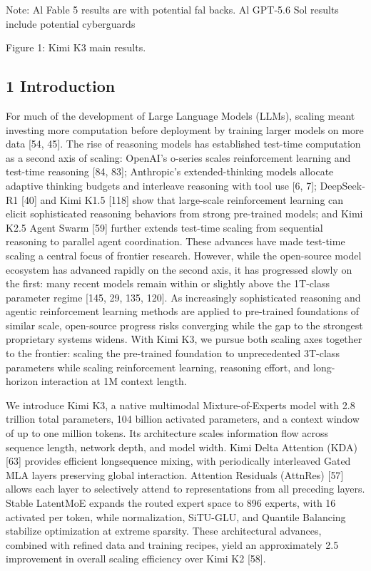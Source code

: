 \documentclass[
  10
]{article}
\begin{document}
Note: Al Fable 5 results are with potential fal backs. Al GPT-5.6 Sol
results include potential cyberguards

Figure 1: Kimi K3 main results.

\subsection{1 Introduction}\label{introduction}

For much of the development of Large Language Models (LLMs), scaling
meant investing more computation before deployment by training larger
models on more data {[}54, 45{]}. The rise of reasoning models has
established test-time computation as a second axis of scaling: OpenAI's
o-series scales reinforcement learning and test-time reasoning {[}84,
83{]}; Anthropic's extended-thinking models allocate adaptive thinking
budgets and interleave reasoning with tool use {[}6, 7{]}; DeepSeek-R1
{[}40{]} and Kimi K1.5 {[}118{]} show that large-scale reinforcement
learning can elicit sophisticated reasoning behaviors from strong
pre-trained models; and Kimi K2.5 Agent Swarm {[}59{]} further extends
test-time scaling from sequential reasoning to parallel agent
coordination. These advances have made test-time scaling a central focus
of frontier research. However, while the open-source model ecosystem has
advanced rapidly on the second axis, it has progressed slowly on the
first: many recent models remain within or slightly above the 1T-class
parameter regime {[}145, 29, 135, 120{]}. As increasingly sophisticated
reasoning and agentic reinforcement learning methods are applied to
pre-trained foundations of similar scale, open-source progress risks
converging while the gap to the strongest proprietary systems widens.
With Kimi K3, we pursue both scaling axes together to the frontier:
scaling the pre-trained foundation to unprecedented 3T-class parameters
while scaling reinforcement learning, reasoning effort, and long-horizon
interaction at 1M context length.

We introduce Kimi K3, a native multimodal Mixture-of-Experts model with
2.8 trillion total parameters, 104 billion activated parameters, and a
context window of up to one million tokens. Its architecture scales
information flow across sequence length, network depth, and model width.
Kimi Delta Attention (KDA) {[}63{]} provides efficient longsequence
mixing, with periodically interleaved Gated MLA layers preserving global
interaction. Attention Residuals (AttnRes) {[}57{]} allows each layer to
selectively attend to representations from all preceding layers. Stable
LatentMoE expands the routed expert space to 896 experts, with 16
activated per token, while normalization, SiTU-GLU, and Quantile
Balancing stabilize optimization at extreme sparsity. These
architectural advances, combined with refined data and training recipes,
yield an approximately 2.5 improvement in overall scaling efficiency
over Kimi K2 {[}58{]}.
\end{document}
